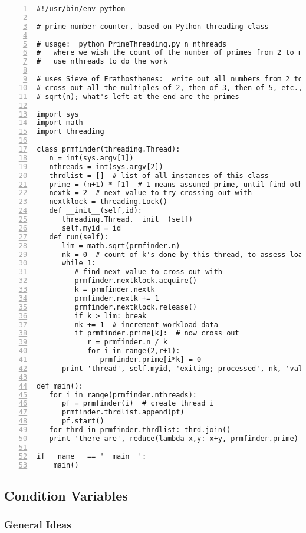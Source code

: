 \begin{Verbatim}[fontsize=\relsize{-2},numbers=left]
#!/usr/bin/env python

# prime number counter, based on Python threading class

# usage:  python PrimeThreading.py n nthreads 
#   where we wish the count of the number of primes from 2 to n, and to
#   use nthreads to do the work

# uses Sieve of Erathosthenes:  write out all numbers from 2 to n, then
# cross out all the multiples of 2, then of 3, then of 5, etc., up to
# sqrt(n); what's left at the end are the primes

import sys
import math
import threading

class prmfinder(threading.Thread):
   n = int(sys.argv[1])
   nthreads = int(sys.argv[2])
   thrdlist = []  # list of all instances of this class
   prime = (n+1) * [1]  # 1 means assumed prime, until find otherwise
   nextk = 2  # next value to try crossing out with
   nextklock = threading.Lock()
   def __init__(self,id):
      threading.Thread.__init__(self)
      self.myid = id
   def run(self):
      lim = math.sqrt(prmfinder.n)
      nk = 0  # count of k's done by this thread, to assess load balance
      while 1:
         # find next value to cross out with
         prmfinder.nextklock.acquire()
         k = prmfinder.nextk
         prmfinder.nextk += 1
         prmfinder.nextklock.release()
         if k > lim: break
         nk += 1  # increment workload data
         if prmfinder.prime[k]:  # now cross out
            r = prmfinder.n / k
            for i in range(2,r+1):
               prmfinder.prime[i*k] = 0
      print 'thread', self.myid, 'exiting; processed', nk, 'values of k'

def main():
   for i in range(prmfinder.nthreads):
      pf = prmfinder(i)  # create thread i
      prmfinder.thrdlist.append(pf) 
      pf.start()
   for thrd in prmfinder.thrdlist: thrd.join()
   print 'there are', reduce(lambda x,y: x+y, prmfinder.prime) - 2, 'primes'

if __name__ == '__main__':
    main()
\end{Verbatim}

\subsection{Condition Variables}

\subsubsection{General Ideas}

